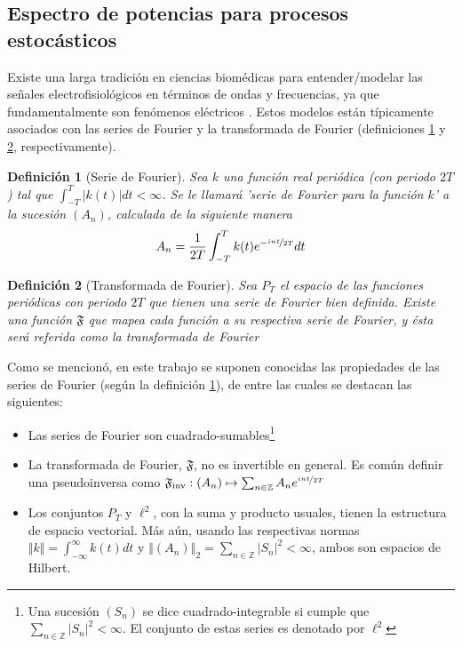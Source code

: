 \documentclass[12pt,a4paper]{mitthesis}
\newtheorem{defn}{Definici\'on}
\newcommand{\intR}{\int_{-\infty}^{\infty}}
\newcommand{\simint}[1]{\int_{- #1 }^{ #1 }}
\newcommand{\abso}[1]{\left| #1 \right|}
\begin{document}

\subsection{Espectro de potencias para procesos estoc\'asticos}

Existe una larga tradici\'on en ciencias biom\'edicas para entender/modelar las se\~nales
electrofisiol\'ogicos en t\'erminos de ondas y frecuencias, ya que fundamentalmente son fen\'omenos 
el\'ectricos \cite{Kaiser00}.  
Estos modelos est\'an t\'ipicamente asociados con las series de Fourier y la transformada de 
Fourier (definiciones \ref{FourierClasico} y \ref{trFourier}, respectivamente).

\begin{defn}[Serie de Fourier]
Sea $k$ una funci\'on real peri\'odica (con periodo $2T$) tal que 
$\simint{T} \abso{k(t)} dt < \infty$. 
Se le llamar\'a 'serie de Fourier para la funci\'on $k$' a la sucesi\'on $\left( A_n \right)$, 
calculada de la siguiente manera
\begin{equation*}
A_n = \frac{1}{2 T} \simint{T} k(t) e^{-\nicefrac{ i n t}{2T}} dt
\end{equation*}
\label{FourierClasico}
\end{defn}

\begin{defn}[Transformada de Fourier]
Sea $P_T$ el espacio de las funciones peri\'odicas con periodo $2T$ que tienen una serie de Fourier 
bien definida. Existe una funci\'on $\mathfrak{F}$ que mapea cada funci\'on a su respectiva serie 
de Fourier, y \'esta ser\'a referida como la transformada de Fourier
\label{trFourier}
\end{defn}

Como se mencion\'o, en este trabajo se suponen conocidas las propiedades de las series de Fourier 
(seg\'un la definici\'on \ref{FourierClasico}), de entre las cuales se destacan las siguientes:
\begin{itemize}
\item Las series de Fourier  son cuadrado-sumables\footnote{Una sucesi\'on $\left( S_n \right)$ se 
dice cuadrado-integrable si cumple que $\sum_{n\in \mathbb{Z}} \abso{S_n}^{2} < \infty$. El 
conjunto de estas series es denotado por $\ell^{2}$}

\item La transformada de Fourier, $\mathfrak{F}$, no es invertible en general. Es com\'un definir
una pseudoinversa como 
$\mathfrak{F}_{\text{inv}} 
: \left( A_n \right) \mapsto \sum_{n \in \mathbb{Z}} A_n e^{\nicefrac{i n t}{2 T}} $

\item Los conjuntos $P_T$ y $\ell^{2}$, con la suma y producto usuales, tienen la estructura de 
espacio vectorial. M\'as a\'un, usando las respectivas normas $\Vert k \Vert = \intR k(t) dt$ y 
$\left\Vert \left( A_n \right) \right\Vert_2 = \sum_{n\in \mathbb{Z}} \abso{S_n}^{2} < \infty$,
ambos son espacios de Hilbert.
\end{itemize}
\end{document}
